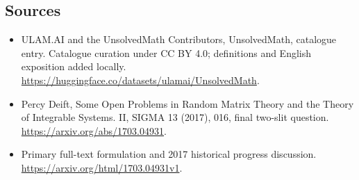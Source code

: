\documentclass[11pt]{article}
\begin{document}
\subsection{Sources}
\begin{itemize}
\item[\hypertarget{source:statement:1}{S1}] ULAM.AI and the UnsolvedMath Contributors, UnsolvedMath, catalogue entry. Catalogue curation under CC BY 4.0; definitions and English exposition added locally.
\url{https://huggingface.co/datasets/ulamai/UnsolvedMath}.
\item[\hypertarget{source:statement:2}{S2}] Percy Deift, Some Open Problems in Random Matrix Theory and the Theory of Integrable Systems. II, SIGMA 13 (2017), 016, final two-slit question.
\url{https://arxiv.org/abs/1703.04931}.
\item[\hypertarget{source:statement:3}{S3}] Primary full-text formulation and 2017 historical progress discussion.
\url{https://arxiv.org/html/1703.04931v1}.
\end{itemize}
\label{end:statement}
\end{document}
